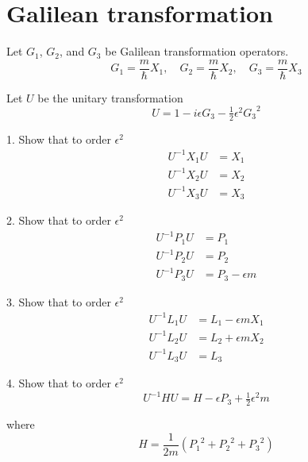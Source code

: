 

\section*{Galilean transformation}

Let $G_1$, $G_2$, and $G_3$ be Galilean transformation operators.
\begin{equation*}
G_1=\frac{m}{\hbar}X_1,\quad G_2=\frac{m}{\hbar}X_2,\quad G_3=\frac{m}{\hbar}X_3
\end{equation*}

Let $U$ be the unitary transformation
\begin{equation*}
U=1-i\epsilon G_3-\tfrac{1}{2}\epsilon^2{G_3}^2
\end{equation*}

1. Show that to order $\epsilon^2$
\begin{align*}
U^{-1}X_1U&=X_1
\\
U^{-1}X_2U&=X_2
\\
U^{-1}X_3U&=X_3
\end{align*}

2. Show that to order $\epsilon^2$
\begin{align*}
U^{-1}P_1U&=P_1
\\
U^{-1}P_2U&=P_2
\\
U^{-1}P_3U&=P_3-\epsilon m
\end{align*}

3. Show that to order $\epsilon^2$
\begin{align*}
U^{-1}L_1U&=L_1-\epsilon mX_1
\\
U^{-1}L_2U&=L_2+\epsilon mX_2
\\
U^{-1}L_3U&=L_3
\end{align*}

4. Show that to order $\epsilon^2$
\begin{equation*}
U^{-1}HU=H-\epsilon P_3+\tfrac{1}{2}\epsilon^2m
\end{equation*}

where
\begin{equation*}
H=\frac{1}{2m}\left({P_1}^2+{P_2}^2+{P_3}^2\right)
\end{equation*}


